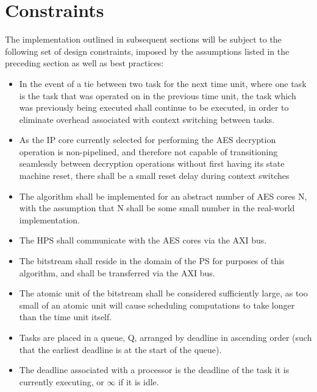 \section{Constraints}\label{subsec:EDFConstraints}
The implementation outlined in subsequent sections will be subject to the following set of design constraints, imposed by the assumptions listed in the preceding section as well as best practices:
\begin{itemize}
    \item In the event of a tie between two task for the next time unit, where one task is the task that was operated on in the previous time unit, the task which was previously being executed shall continue to be executed, in order to eliminate overhead associated with context switching between tasks.
    \item As the IP core currently selected for performing the AES decryption operation is non-pipelined, and therefore not capable of transitioning seamlessly between decryption operations without first having its state machine reset, there shall be a small reset delay during context switches
    \item The algorithm shall be implemented for an abstract number of AES cores N, with the assumption that N shall be some small number in the real-world implementation.
    \item The HPS shall communicate with the AES cores via the AXI bus.
    \item The bitstream shall reside in the domain of the PS for purposes of this algorithm, and shall be transferred via the AXI bus.
    \item The atomic unit of the bitstream shall be considered sufficiently large, as too small of an atomic unit will cause scheduling computations to take longer than the time unit itself.
    \item Tasks are placed in a queue, Q, arranged by deadline in ascending order (such that the earliest deadline is at the start of the queue). 
    \item The deadline associated with a processor is the deadline of the task it is currently executing, or $\infty$ if it is idle.
\end{itemize}

